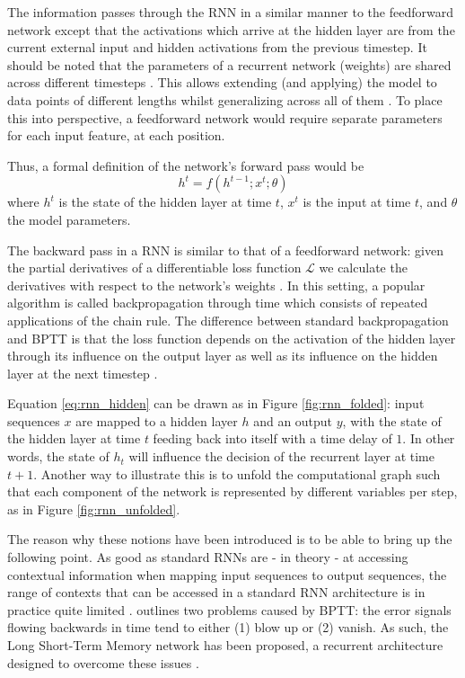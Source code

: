 \documentclass[a4paper]{book}
\begin{document}
The information passes through the RNN in a similar manner to the feedforward network except that the activations which arrive at the hidden layer are from the current external input and hidden activations from the previous timestep. It should be noted that the parameters of a recurrent network (weights) are shared across different timesteps \parencite{graves_supervised_2012}. This allows extending (and applying) the model to data points of different lengths whilst generalizing across all of them \parencite{goodfellow_deep_2016}. To place this into perspective, a feedforward network would require separate parameters for each input feature, at each position.

Thus, a formal definition of the network's forward pass would be
\begin{equation}
    h^t = f(h^{t-1}; x^t; \theta) \label{eq:rnn_hidden}
\end{equation}
where $h^t$ is the state of the hidden layer at time $t$, $x^t$ is the input at time $t$, and $\theta$ the model parameters.

The backward pass in a RNN is similar to that of a feedforward network: given the partial derivatives of a differentiable loss function $\mathcal{L}$ we calculate the derivatives with respect to the network's weights \parencite{graves_supervised_2012}. In this setting, a popular algorithm is called backpropagation through time \parencite[BPTT;][]{werbos_backpropagation_1990} which consists of repeated applications of the chain rule. The difference between standard backpropagation and BPTT is that the loss function depends on the activation of the hidden layer through its influence on the output layer as well as its influence on the hidden layer at the next timestep \parencite{graves_supervised_2012}.

Equation \ref{eq:rnn_hidden} can be drawn as in Figure \ref{fig:rnn_folded}: input sequences $x$ are mapped to a hidden layer $h$ and an output $y$, with the state of the hidden layer at time $t$ feeding back into itself with a time delay of $1$. In other words, the state of $h_t$ will influence the decision of the recurrent layer at time $t+1$. Another way to illustrate this is to unfold the computational graph such that each component of the network is represented by different variables per step, as in Figure \ref{fig:rnn_unfolded}.

The reason why these notions have been introduced is to be able to bring up the following point. As good as standard RNNs are - in theory - at accessing contextual information when mapping input sequences to output sequences, the range of contexts that can be accessed in a standard RNN architecture is in practice quite limited \parencite{graves_supervised_2012}. \textcite{hochreiter_long_1997} outlines two problems caused by BPTT: the error signals flowing backwards in time tend to either (1) blow up or (2) vanish. As such, the Long Short-Term Memory network has been proposed, a recurrent architecture designed to overcome these issues \parencite{hochreiter_long_1997}.
\end{document}
